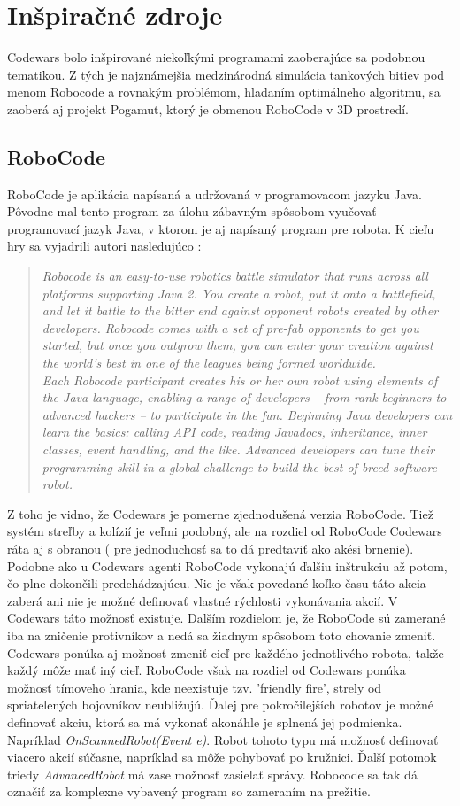 \chapter{Inšpiračné zdroje}
Codewars bolo inšpirované niekoľkými programami zaoberajúce sa podobnou tematikou. Z tých je najznámejšia medzinárodná simulácia tankových bitiev pod menom Robocode\cite{robocode} a rovnakým problémom, hladaním optimálneho algoritmu, sa zaoberá aj projekt Pogamut\cite{pogamut}, ktorý je obmenou RoboCode v 3D prostredí.\\
\section {RoboCode}
RoboCode je aplikácia napísaná a udržovaná v programovacom jazyku Java. Pôvodne mal tento program za úlohu zábavným spôsobom vyučovať programovací jazyk Java, v ktorom je aj napísaný program pre robota. K cieľu hry sa vyjadrili autori nasledujúco \cite{robocode}:
\begin{quote}\emph{Robocode is an easy-to-use robotics battle simulator that runs across all platforms supporting Java 2. You create a robot, put it onto a battlefield, and let it battle to the bitter end against opponent robots created by other developers. Robocode comes with a set of pre-fab opponents to get you started, but once you outgrow them, you can enter your creation against the world's best in one of the leagues being formed worldwide.\\
	Each Robocode participant creates his or her own robot using elements of the Java language, enabling a range of developers -- from rank beginners to advanced hackers -- to participate in the fun. Beginning Java developers can learn the basics: calling API code, reading Javadocs, inheritance, inner classes, event handling, and the like. Advanced developers can tune their programming skill in a global challenge to build the best-of-breed software robot.}\end{quote}\cite{robocode}
Z toho je vidno, že Codewars je pomerne zjednodušená verzia RoboCode. Tiež systém streľby a kolízií je veľmi podobný, ale na rozdiel od RoboCode Codewars ráta aj s obranou ( pre jednoduchosť sa to dá predtaviť ako akési brnenie). Podobne ako u Codewars agenti RoboCode vykonajú ďalšiu inštrukciu až potom, čo plne dokončili predchádzajúcu. Nie je však povedané koľko času táto akcia zaberá ani nie je možné definovať vlastné rýchlosti vykonávania akcií. V Codewars táto možnosť existuje.
Dalším rozdielom je, že RoboCode sú zamerané iba na zničenie protivníkov a nedá sa žiadnym spôsobom toto chovanie zmeniť. Codewars ponúka aj možnosť zmeniť cieľ pre každého jednotlivého robota, takže každý môže mať iný cieľ. RoboCode však na rozdiel od Codewars ponúka možnosť tímoveho hrania, kde neexistuje tzv. 'friendly fire', strely od spriatelených bojovníkov neubližujú. Ďalej pre pokročilejších robotov je možné definovať akciu, ktorá sa má vykonať akonáhle je splnená jej podmienka. Napríklad \emph{OnScannedRobot(Event e)}. Robot tohoto typu má možnosť definovať viacero akcií súčasne, napríklad sa môže pohybovať po kružnici. Ďalší potomok triedy \emph{AdvancedRobot} má zase možnosť zasielať správy. Robocode sa tak dá označiť za komplexne vybavený program so zameraním na prežitie.
